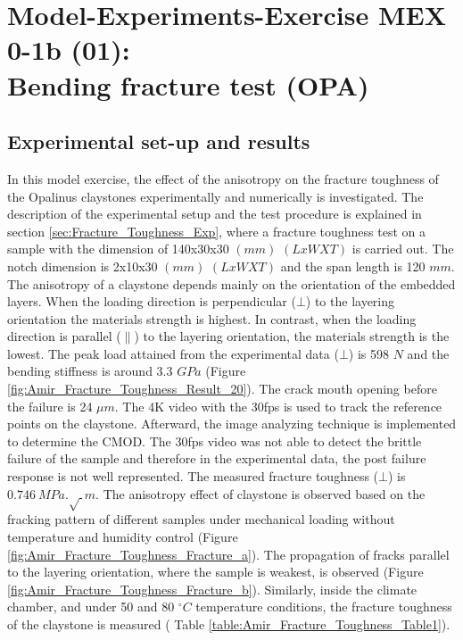 \section[MEX 0-1b: Bending fracture test (OPA)]{Model-Experiments-Exercise MEX 0-1b (01):\\Bending fracture test (OPA)}
\label{sec:mex01b}

\subsection{Experimental set-up and results}

In this model exercise, the effect of the anisotropy on the fracture toughness of the Opalinus claystones experimentally and numerically is investigated. The description of the experimental setup and the test procedure is explained in section \ref{sec:Fracture_Toughness_Exp}, where a fracture toughness test on a sample with the dimension of 140x30x30 $(mm)$ $(LxWXT)$ is carried out. The notch dimension is 2x10x30 $(mm)$ $(LxWXT)$ and the span length is 120 $mm$. The anisotropy of a claystone depends mainly on the orientation of the embedded layers. When the loading direction is perpendicular ($\bot$) to the layering orientation the materials strength is highest. In contrast, when the loading direction is parallel ($\parallel$) to the layering orientation, the materials strength is the lowest. The peak load attained from the experimental data ($\bot$) is 598 $N$ and the bending stiffness is around 3.3 $GPa$ (Figure \ref{fig:Amir_Fracture_Toughness_Result_20}). The crack mouth opening before the failure is 24 $\mu m$. The 4K video with the 30fps is used to track the reference points on the claystone. Afterward, the image analyzing technique is implemented to determine the CMOD. The 30fps video was not able to detect the brittle failure of the sample and therefore in the experimental data, the post failure response is not well represented. The measured fracture toughness ($\bot$) is $0.746\ MPa.\sqrt\ m$. The anisotropy effect of claystone is observed based on the fracking pattern of different samples under mechanical loading without temperature and humidity control (Figure \ref{fig:Amir_Fracture_Toughness_Fracture_a}). The propagation of fracks parallel to the layering orientation, where the sample is weakest, is observed (Figure \ref{fig:Amir_Fracture_Toughness_Fracture_b}). Similarly, inside the climate chamber, and under 50 and 80 $^{\circ}C$ temperature conditions, the fracture toughness of the claystone is measured ( Table \ref{table:Amir_Fracture_Toughness_Table1}).

